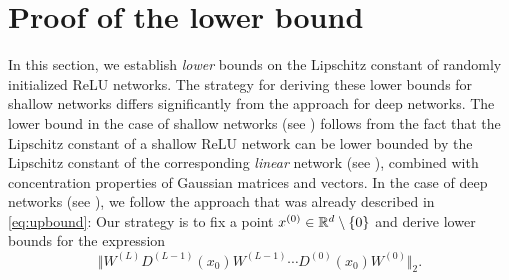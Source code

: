 \newcommand{\gell}{\mathcal{G}^{(\ell)}}
\newcommand{\hell}{\mathcal{H}^{(\ell)}}
\newcommand{\gelll}{\mathcal{G}^{(\ell+1)}}
\newcommand{\G}{\mathcal{G}'}

\section{Proof of the lower bound} \label{sec:low_bound}
In this section, we establish \emph{lower} bounds on the Lipschitz constant of randomly initialized ReLU networks. 
The strategy for deriving these lower bounds for shallow networks differs significantly from the approach for deep networks. 
The lower bound in the case of shallow networks (see ) follows from the fact that the 
Lipschitz constant of a shallow ReLU network can be lower bounded by the Lipschitz constant of the corresponding \emph{linear} network (see ), combined with
 concentration properties of Gaussian matrices and vectors. 
In the case of deep networks (see ), we follow the approach that was already described in \eqref{eq:upbound}: 
Our strategy is to fix a point $x^{(0)} \in \mathbb{R}^d \setminus \{0\}$ and derive lower bounds for the expression
\begin{equation*}
\Vert W^{(L)} D^{(L-1)}(x_0)W^{(L-1)} \cdots D^{(0)}(x_0) W^{(0)} \Vert_2.
\end{equation*}


